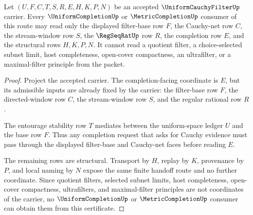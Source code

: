 \begin{theorem}
\label{thm:uniform-cauchy-filter-completion-handoff}
Let $(U,F,C,T,S,R,E,H,K,P,N)$ be an accepted $\UniformCauchyFilterUp$ carrier. Every $\UniformCompletionUp$ or $\MetricCompletionUp$ consumer of this route may read only the displayed filter-base row $F$, the Cauchy-net row $C$, the stream-window row $S$, the $\RegSeqRatUp$ row $R$, the completion row $E$, and the structural rows $H,K,P,N$. It cannot read a quotient filter, a choice-selected subnet limit, host completeness, open-cover compactness, an ultrafilter, or a maximal-filter principle from the packet.
\end{theorem}
\begin{proof}
Project the accepted carrier. The completion-facing coordinate is $E$, but its admissible inputs are already fixed by the carrier: the filter-base row $F$, the directed-window row $C$, the stream-window row $S$, and the regular rational row $R$.

The entourage stability row $T$ mediates between the uniform-space ledger $U$ and the base row $F$. Thus any completion request that asks for Cauchy evidence must pass through the displayed filter-base and Cauchy-net faces before reading $E$.

The remaining rows are structural. Transport by $H$, replay by $K$, provenance by $P$, and local naming by $N$ expose the same finite handoff route and no further coordinate. Since quotient filters, selected subnet limits, host completeness, open-cover compactness, ultrafilters, and maximal-filter principles are not coordinates of the carrier, no $\UniformCompletionUp$ or $\MetricCompletionUp$ consumer can obtain them from this certificate.
\end{proof}

\begin{closurestatus}{\UniformCauchyFilterUp}
  \theoryclosure{\seedClosure}
  \formalstatus{\unformalizedV}
\end{closurestatus}
